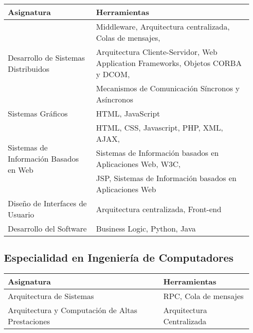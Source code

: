 \begin{center}
	\begin{tabular}{l|l}
		\textbf{Asignatura}                                     & \textbf{Herramientas} \\ \hline
		\multirow{3}{*}{Desarrollo de Sistemas Distribuidos}    & Middleware, Arquitectura centralizada, Colas de mensajes, \\
		                                                        & Arquitectura Cliente-Servidor, Web Application Frameworks, Objetos CORBA y DCOM, \\
		                                                        & Mecanismos de Comunicación Síncronos y Asíncronos \\
		Sistemas Gráficos                                       & HTML, JavaScript \\
		\multirow{3}{*}{Sistemas de Información Basados en Web} & HTML, CSS, Javascript, PHP, XML, AJAX, \\
		                                                        & Sistemas de Información basados en Aplicaciones Web, W3C,\\
		                                                        & JSP, Sistemas de Información basados en Aplicaciones Web \\
		Diseño de Interfaces de Usuario                         & Arquitectura centralizada, Front-end \\
		Desarrollo del Software                                 & Business Logic, Python, Java
	\end{tabular}
\end{center}

\pagebreak

\subsection{Especialidad en Ingeniería de Computadores}

\begin{center}
	\begin{tabular}{l|l}
		\textbf{Asignatura}                              & \textbf{Herramientas} \\ \hline
		Arquitectura de Sistemas                         & RPC, Cola de mensajes \\
		Arquitectura y Computación de Altas Prestaciones & Arquitectura Centralizada
	\end{tabular}
\end{center}

